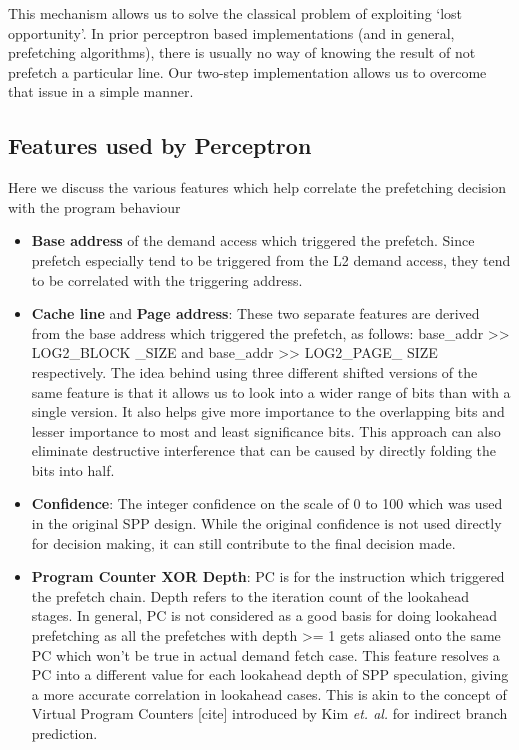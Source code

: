 \documentclass{sig-alternate}
\begin{document}
This mechanism allows us to solve the classical problem of exploiting `lost opportunity'. 
In prior perceptron based implementations (and in general, prefetching algorithms), there is usually no way of knowing the result of not prefetch a particular line.
Our two-step implementation allows us to overcome that issue in a simple manner.

\subsection{Features used by Perceptron}

Here we discuss the various features which help correlate the prefetching decision with the program behaviour
\begin{itemize}
\item \textbf{Base address} of the demand access which triggered the prefetch. 
Since prefetch especially tend to be triggered from the L2 demand access, they tend to be correlated with the triggering address.

\item \textbf{Cache line} and \textbf{Page address}: These two separate features are derived from the base address which triggered the prefetch, as follows: base\_addr >> LOG2\_BLOCK \_SIZE and base\_addr >> LOG2\_PAGE\_ SIZE respectively.
The idea behind using three different shifted versions of the same feature is that it allows us to look into a wider range of bits than with a single version.
It also helps give more importance to the overlapping bits and lesser importance to most and least significance bits.
This approach can also eliminate destructive interference that can be caused by directly folding the bits into half.

\item \textbf{Confidence}: The integer confidence on the scale of 0 to 100 which was used in the original SPP design.
While the original confidence is not used directly for decision making, it can still contribute to the final decision made.

\item \textbf{Program Counter XOR Depth}: PC is for the instruction which triggered the prefetch chain.
Depth refers to the iteration count of the lookahead stages.
In general, PC is not considered as a good basis for doing lookahead prefetching as all the prefetches with depth >= 1 gets aliased onto the same PC which won't be true in actual demand fetch case.
This feature resolves a PC into a different value for each lookahead depth of SPP speculation, giving a more accurate correlation in lookahead cases.
This is akin to the concept of Virtual Program Counters [cite] introduced by Kim \textit{et. al.} for indirect branch prediction.



\end{itemize}
\end{document}
